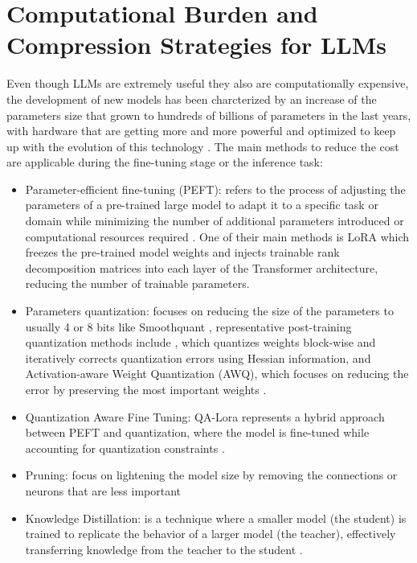 \section{Computational Burden and Compression Strategies for LLMs}
Even though LLMs are extremely useful they also are computationally expensive, the development of new models has been charcterized by an increase of the parameters size that grown to hundreds of billions of parameters in the last years, with hardware that are getting more and more powerful and optimized to keep up with the evolution of this technology \cite{li2024large}. 
The main methods to reduce the cost are applicable during the fine-tuning stage or the inference task:
\begin{itemize}
    \item Parameter-efficient fine-tuning (PEFT): refers to the process of adjusting the parameters of a pre-trained large model to adapt it to a specific task or domain while minimizing the number of additional parameters introduced or computational resources required \cite{han2024parameter}. One of their main methods is LoRA \cite{hu2022lora} which freezes the pre-trained model weights and injects trainable rank decomposition matrices into each layer of the Transformer architecture, reducing the number of trainable parameters.
    \item Parameters quantization: focuses on reducing the size of the parameters to usually 4 or 8 bits like Smoothquant \cite{xiao2023smoothquant}, representative post-training quantization methods include  \cite{frantar2022gptq}, which quantizes weights block-wise and iteratively corrects quantization errors using Hessian information, and Activation-aware Weight Quantization (AWQ), which focuses on reducing the error by preserving the most important weights \cite{awq}.
    \item Quantization Aware Fine Tuning: QA-Lora represents a hybrid approach between PEFT and quantization, where the model is fine-tuned while accounting for quantization constraints \cite{xu2023qa}.
    \item Pruning: focus on lightening the model size by removing the connections or neurons that are less important \cite{gordon2020compressing, sreenivas2024llm}
    \item Knowledge Distillation: is a technique where a smaller model (the student) is trained to replicate the behavior of a larger model (the teacher), effectively transferring knowledge from the teacher to the student \cite{hinton2015distilling, sanh2019distilbert}.
\end{itemize}

